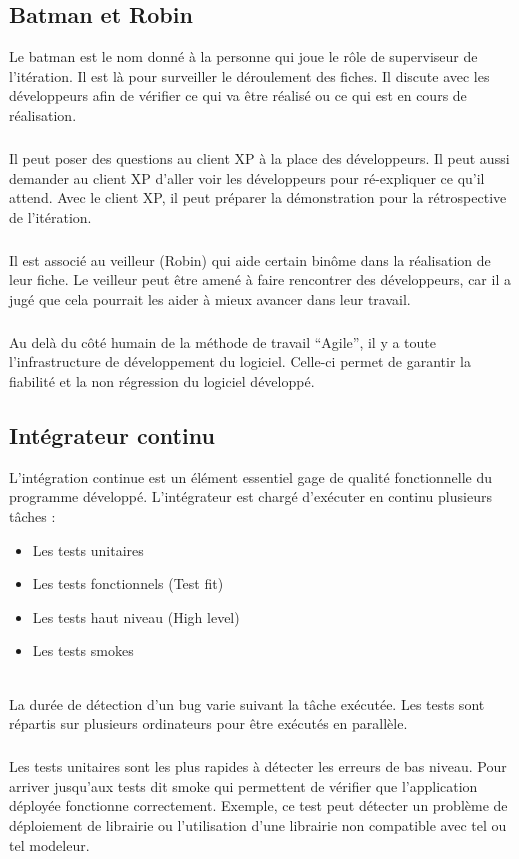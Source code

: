 \subsection{Batman et Robin}

Le batman est le nom donné à la personne qui joue le rôle de superviseur de l'itération.
Il est là pour surveiller le déroulement des fiches.
Il discute avec les développeurs afin de vérifier ce qui va être réalisé ou ce qui est en cours de réalisation.

\subparagraph*{}
Il peut poser des questions au client XP à la place des développeurs.
Il peut aussi demander au client XP d'aller voir les développeurs pour ré-expliquer ce qu'il attend.
Avec le client XP, il peut préparer la démonstration pour la rétrospective de l’itération.

\subparagraph*{}
Il est associé au veilleur (Robin) qui aide certain binôme dans la réalisation de leur fiche.
Le veilleur peut être amené à faire rencontrer des développeurs, car il a jugé que cela pourrait les aider à mieux avancer dans leur travail.

\subparagraph*{}
Au delà du côté humain de la méthode de travail ``Agile'', il y a toute l'infrastructure de développement du logiciel. Celle-ci permet de garantir la fiabilité et la non régression du logiciel développé.

\subsection{Intégrateur continu}

L'intégration continue est un élément essentiel gage de qualité fonctionnelle du programme développé.
L'intégrateur est chargé d'exécuter en continu plusieurs tâches :
\begin{itemize}
  \item Les tests unitaires
  \item Les tests fonctionnels (Test fit)
  \item Les tests haut niveau (High level)
  \item Les tests smokes
\end{itemize}
\ \\
La durée de détection d'un bug varie suivant la tâche exécutée. Les tests sont répartis sur plusieurs ordinateurs pour être exécutés en parallèle.

\subparagraph*{}
Les tests unitaires sont les plus rapides à détecter les erreurs de bas niveau.
Pour arriver jusqu'aux tests dit smoke qui permettent de vérifier que l'application déployée fonctionne correctement. 
Exemple, ce test peut détecter un problème de déploiement de librairie ou l'utilisation d'une librairie non compatible avec tel ou tel modeleur. 

